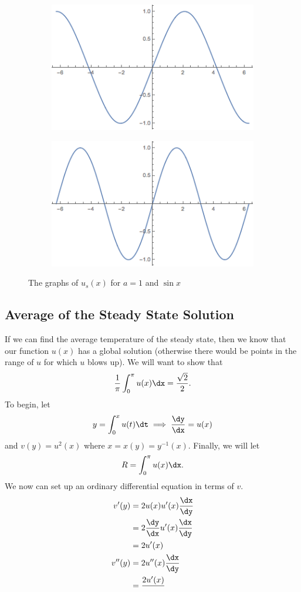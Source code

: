 \documentclass{hw}
\begin{document}
\begin{figure}[h]
\centering
\begin{subfigure}{0.45\textwidth}
\includegraphics[scale=0.5]{u_of_1_x}
\end{subfigure}
\hfill
\begin{subfigure}{0.45\textwidth}
\includegraphics[scale=0.5]{sinx}
\end{subfigure}
\caption{The graphs of $u_{s}(x)$ for $a=1$ and $\sin{x}$}
\end{figure}

\subsection{Average of the Steady State Solution}

If we can find the average temperature of the steady state, then we know that our function $u(x)$
has a global solution (otherwise there would be points in the range of $u$ for which $u$ blows up).
We will want to show that
\[
{1\over\pi}\int_{0}^{\pi}u(x)\dx={\sqrt{2}\over2}.
\]
To begin, let
\[
y=\int_{0}^{x}u(t)\dt \implies {\dy\over\dx} = u(x)
\]
and $v(y)=u^{2}(x)$ where $x=x(y)=y^{-1}(x)$. Finally, we will let
\[
R=\int_{0}^{\pi}u(x)\dx.
\]
We now can set up an ordinary differential equation in terms of $v$.
\begin{align*}
v'(y)&=2u(x)u'(x){\dx\over\dy}\\
&= 2{\dy\over\dx}u'(x){\dx\over\dy}\\
&= 2u'(x)\\
v''(y)&= 2u''(x){\dx\over\dy}\\
&= {2u'(x)\over}
\end{align*}
\end{document}
